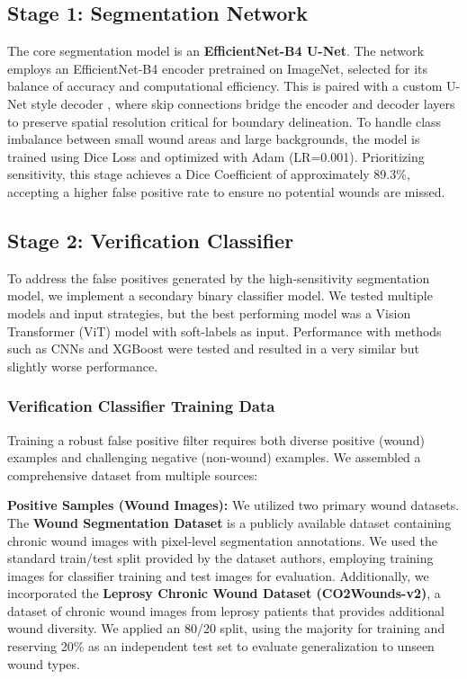 \documentclass{article}
\begin{document}
\subsection{Stage 1: Segmentation Network}
The core segmentation model is an \textbf{EfficientNet-B4 U-Net}.
The network employs an EfficientNet-B4 encoder \cite{tan2019efficientnet} pretrained on ImageNet, selected for its balance of accuracy and computational efficiency. This is paired with a custom U-Net style decoder \cite{ronneberger2015unet}, where skip connections bridge the encoder and decoder layers to preserve spatial resolution critical for boundary delineation. To handle class imbalance between small wound areas and large backgrounds, the model is trained using Dice Loss and optimized with Adam (LR=0.001). Prioritizing sensitivity, this stage achieves a Dice Coefficient of approximately 89.3\%, accepting a higher false positive rate to ensure no potential wounds are missed.

\subsection{Stage 2: Verification Classifier}
To address the false positives generated by the high-sensitivity segmentation model, we implement a secondary binary classifier model. We tested multiple models and input strategies, but the best performing model was a Vision Transformer (ViT) model with soft-labels as input. Performance with methods such as CNNs and XGBoost were tested and resulted in a very similar but slightly worse performance.

\subsubsection{Verification Classifier Training Data}
Training a robust false positive filter requires both diverse positive (wound) examples and challenging negative (non-wound) examples. We assembled a comprehensive dataset from multiple sources:

\textbf{Positive Samples (Wound Images):} We utilized two primary wound datasets. The \textbf{Wound Segmentation Dataset} \cite{wang2020wound} is a publicly available dataset containing chronic wound images with pixel-level segmentation annotations. We used the standard train/test split provided by the dataset authors, employing training images for classifier training and test images for evaluation. Additionally, we incorporated the \textbf{Leprosy Chronic Wound Dataset (CO2Wounds-v2)}, a dataset of chronic wound images from leprosy patients that provides additional wound diversity. We applied an 80/20 split, using the majority for training and reserving 20\% as an independent test set to evaluate generalization to unseen wound types.
\end{document}
